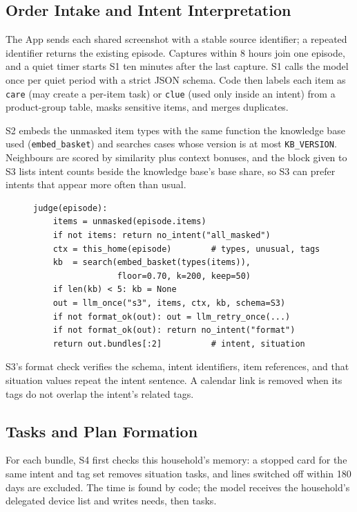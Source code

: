 \documentclass[conference]{IEEEtran}
\begin{document}
\subsection{Order Intake and Intent Interpretation}
The App sends each shared screenshot with a stable source identifier; a repeated identifier returns the existing episode. Captures within 8 hours join one episode, and a quiet timer starts S1 ten minutes after the last capture. S1 calls the model once per quiet period with a strict JSON schema. Code then labels each item as \texttt{care} (may create a per-item task) or \texttt{clue} (used only inside an intent) from a product-group table, masks sensitive items, and merges duplicates.

S2 embeds the unmasked item types with the same function the knowledge base used (\texttt{embed\_basket}) and searches cases whose version is at most \texttt{KB\_VERSION}. Neighbours are scored by similarity plus context bonuses, and the block given to S3 lists intent counts beside the knowledge base's base share, so S3 can prefer intents that appear more often than usual.

\begin{figure}[!t]
\noindent\begin{minipage}{\columnwidth}
\begin{lstlisting}
judge(episode):
    items = unmasked(episode.items)
    if not items: return no_intent("all_masked")
    ctx = this_home(episode)        # types, unusual, tags
    kb  = search(embed_basket(types(items)),
                 floor=0.70, k=200, keep=50)
    if len(kb) < 5: kb = None
    out = llm_once("s3", items, ctx, kb, schema=S3)
    if not format_ok(out): out = llm_retry_once(...)
    if not format_ok(out): return no_intent("format")
    return out.bundles[:2]          # intent, situation
\end{lstlisting}
\end{minipage}
\end{figure}
S3's format check verifies the schema, intent identifiers, item references, and that situation values repeat the intent sentence. A calendar link is removed when its tags do not overlap the intent's related tags.

\subsection{Tasks and Plan Formation}
For each bundle, S4 first checks this household's memory: a stopped card for the same intent and tag set removes situation tasks, and lines switched off within 180 days are excluded. The time is found by code; the model receives the household's delegated device list and writes needs, then tasks.
\end{document}
